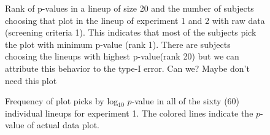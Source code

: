\documentclass{article}
\newcommand{\green}[1]{{\color{green} #1}} %
\begin{document}
\begin{figure}[hbtp]
   \centering
       \caption{Rank of p-values in a lineup of size 20 and the number of subjects choosing that plot in the lineup of experiment 1 and 2 with raw data (screening criteria 1). This indicates that most of the subjects pick the plot with minimum p-value (rank 1). There are subjects choosing the lineups with highest p-value(rank 20) but we can attribute this behavior to the type-I error. Can we?  \green{Maybe don't need this plot}}
       \label{fig:P-val_rank}
\end{figure}

\begin{figure}[hbtp]
   \centering
       \caption{Frequency of plot picks by log$_{10}$ $p$-value in all of the sixty (60) individual lineups for experiment 1. The colored lines indicate the $p$-value of actual data plot.}
       \label{fig:P-val_log}
\end{figure}
\end{document}
